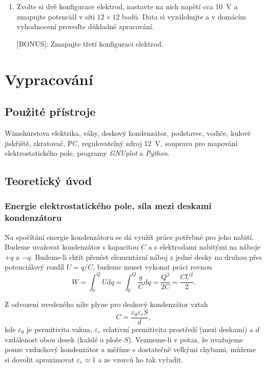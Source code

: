 \documentclass[english]{article}
\newcommand{\dd}{\mathrm{d}}
\begin{document}
\begin{enumerate}
[BONUS]: Bonusové body lze získat za volbu tvaru funkce $f(s/D)$, který bude vhodně popisovat chování grafu.

\item Zvolte si dvě konfigurace elektrod, nastavte na nich napětí cca 10~V a zmapujte potenciál v síti $12\times12$ bodů. Data si vyzálohujte a v domácím vyhodnocení proveďte důkladné zpracování. 

[BONUS]: Zmapujte třetí konfiguraci elektrod.

\end{enumerate}

	
\section{Vypracování}

	\subsection{Použité přístroje}
		Wimshurstova elektrika, váhy, deskový kondenzátor, podstavec, vodiče, kulové jiskřiště, zkratovač, PC, regulovatelný zdroj 12~V, souprava pro mapování elektrostatického pole, programy \emph{GNUplot} a \emph{Python}.
			
	\subsection{Teoretický úvod}
		\subsubsection{Energie elektrostatického pole, síla mezi deskami kondenzátoru}
		Na spočítání energie kondenzátoru se dá využít práce potřebné pro jeho nabití. Budeme uvažovat kondenzátor s kapacitou $C$ a s elektrodami nabitými na náboje $+q$ a $-q$. Budeme-li chtít přenést elementární náboj z jedné desky na druhou přes potenciálový rozdíl $U = q/C$, budeme muset vykonat práci rovnou
		\begin{equation}
		W = \int_{0}^{Q}U \dd q = \int_{0}^{Q} \frac{q}{C} \dd q = \frac{Q^2}{2C} = \frac{C U^2}{2}.
		\end{equation}
		
		Z odvození uvedeného níže plyne pro deskový kondenzátor vztah 
		\begin{equation}
		C = \frac{\varepsilon_0 \varepsilon_r S}{d},
		\end{equation}
		kde $\varepsilon_0$ je permitivita vakua, $\varepsilon_r$ relativní permitivita prostředí (mezi deskami) a $d$ vzdálenost obou desek (každé  o ploše $S$). Vezmeme-li v potaz, že uvažujeme pouze vzduchový kondenzátor a měříme s dostatečně velkými chybami, můžeme si dovolit aproximovat $\varepsilon_r \approx 1$ a ze vzorců ho tak vyřadit.
		
\end{document}
